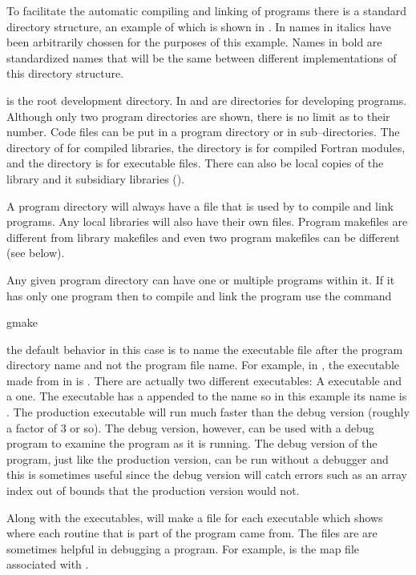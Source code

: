 To facilitate the automatic compiling and linking of programs there is
a standard directory structure, an example of which is shown in
. In  names in italics
have been arbitrarily chossen for the purposes of this example. Names
in bold are standardized names that will be the same between different
implementations of this directory structure.

 is the root development directory.  In
  and 
are directories for developing programs. Although only two program
directories are shown, there is no limit as to their number. Code
files can be put in a program directory or in sub--directories. The
 directory of for compiled libraries, the 
directory is for compiled Fortran modules, and the  directory
is for executable files. There can also be local copies of the
 library and it subsidiary libraries ().

A program directory will always have a  file that is used
by  to compile and link programs. Any local libraries will
also have their own  files. Program makefiles are
different from library makefiles and even two program makefiles can 
be different (see below).

Any given program directory can have one or multiple programs within
it. If it has only one program then to compile and link the program
use the command
\begin{example}
  gmake
\end{example}
the default  behavior in this case is to name the executable
file after the program directory name and not the program file
name. For example, in , the executable made
from  in  is
. There are actually two different executables:
A  executable and a  one. The 
executable has a  appended to the name so in this example its
name is .  The production executable will run
much faster than the debug version (roughly a factor of 3 or so). The
debug version, however, can be used with a debug program to examine
the program as it is running.  The debug version of the program, just
like the production version, can be run without a debugger and this is
sometimes useful since the debug version will catch errors such as an
array index out of bounds that the production version would not.

Along with the executables,  will make a  file for
each executable which shows where each routine that is part of the
program came from. The  files are are sometimes helpful in
debugging a program. For example,  is the
map file associated with .

